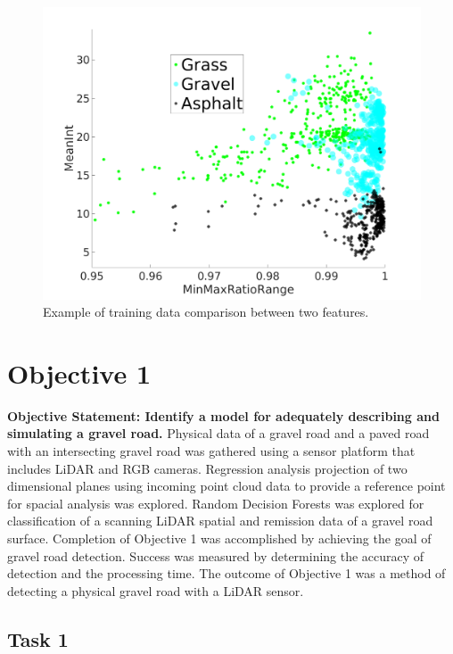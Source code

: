 \documentclass[numbered,pdftex]{ohio-etd}
\begin{document}
{		
		
		\begin{figure}[H]
			\centering
			\includegraphics[width=0.7\linewidth]{Defense_Images/training_data_cluster}
			\caption[Example Clustering]{Example of training data comparison between two features.}
			\label{fig:training_data_cluster}
		\end{figure}
		

	\section{Objective 1}{
		
		{\textbf{Objective Statement: Identify a model for adequately describing and simulating a gravel road.} Physical data of a gravel road and a paved road with an intersecting gravel road was gathered using a sensor platform that includes LiDAR and RGB cameras. Regression analysis projection of two dimensional planes using incoming point cloud data to provide a reference point for spacial analysis was explored. Random Decision Forests was explored for classification of a scanning LiDAR spatial and remission data of a gravel road surface. Completion of Objective 1 was accomplished by achieving the goal of gravel road detection. Success was measured by determining the accuracy of detection and the processing time. The outcome of Objective 1 was a method of detecting a physical gravel road with a LiDAR sensor.}
	
		\subsection{Task 1}{
	
}}}
\end{document}
